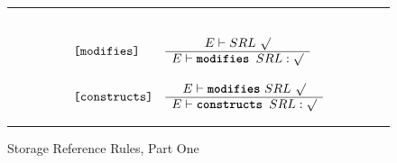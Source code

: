 \documentclass[12pt]{article} %
\newcommand{\reserved}[1]{\textbf{\texttt{#1}}} %
\newcommand{\RULELAB}[1]{\texttt{#1}}
\newcommand{\UNSPACEFORBOX}{\vspace{-2ex}}
\newcommand{\HLINE}{\UNSPACEFORBOX%
\begin{flushleft}\rule{\textwidth}{0.01in}\end{flushleft}%
\UNSPACEFORBOX}
\newenvironment{BFIGURE}{

\begin{figure}
\small
\HLINE
}{
\HLINE
\normalsize
\end{figure}
}
\begin{document}
\begin{BFIGURE}
\begin{displaymath}
\begin{array}{lll}
~\\
\RULELAB{[modifies]} &
\begin{array}{c}
E \vdash SRL~\surd \\
\hline
E \vdash \mbox{\reserved{modifies }} SRL: \surd
\end{array}
\\
~\\
\RULELAB{[constructs]} &
\begin{array}{c}
E \vdash \reserved{modifies}~ SRL~\surd \\
\hline
E \vdash \mbox{\reserved{constructs }} SRL: \surd
\end{array}
\end{array}
\end{displaymath}
\caption{Storage Reference Rules, Part One}
\label{ref-fig}
\end{BFIGURE}
\end{document}
